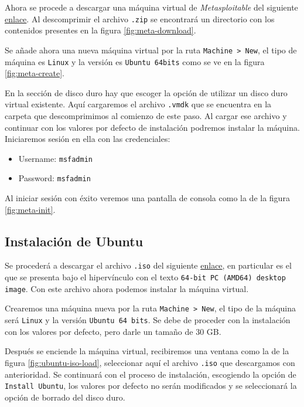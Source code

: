 \documentclass{article}
\begin{document}
            Ahora se procede a descargar una máquina virtual de \emph{Metasploitable} del siguiente \href{https://sourceforge.net/projects/metasploitable/}{enlace}. Al descomprimir el archivo \texttt{.zip} se encontrará un directorio con los contenidos presentes en la figura \ref{fig:meta-download}.

            Se añade ahora una nueva máquina virtual por la ruta \texttt{Machine > New}, el tipo de máquina es \texttt{Linux} y la versión es \texttt{Ubuntu 64bits} como se ve en la figura \ref{fig:meta-create}.

            En la sección de disco duro hay que escoger la opción de utilizar un disco duro virtual existente. Aquí cargaremos el archivo \texttt{.vmdk} que se encuentra en la carpeta que descomprimimos al comienzo de este paso. Al cargar ese archivo y continuar con los valores por defecto de instalación podremos instalar la máquina. Iniciaremos sesión en ella con las credenciales:
            \begin{itemize}
                \item Username: \texttt{msfadmin}
                \item Password: \texttt{msfadmin}
            \end{itemize}

            Al iniciar sesión con éxito veremos una pantalla de consola como la de la figura \ref{fig:meta-init}.

        \subsection{Instalación de Ubuntu}

            Se procederá a descargar el archivo \texttt{.iso} del siguiente \href{https://releases.ubuntu.com/focal/}{enlace}, en particular es el que se presenta bajo el hipervínculo con el texto \texttt{64-bit PC (AMD64) desktop image}. Con este archivo ahora podemos instalar la máquina virtual.

            Crearemos una máquina nueva por la ruta \texttt{Machine > New}, el tipo de la máquina será \texttt{Linux} y la versión \texttt{Ubuntu 64 bits}. Se debe de proceder con la instalación con los valores por defecto, pero darle un tamaño de 30 GB.

            Después se enciende la máquina virtual, recibiremos una ventana como la de la figura \ref{fig:ubuntu-iso-load}, seleccionar aquí el archivo \texttt{.iso} que descargamos con anterioridad. Se continuará con el proceso de instalación, escogiendo la opción de \texttt{Install Ubuntu}, los valores por defecto no serán modificados y se seleccionará la opción de borrado del disco duro.
\end{document}
